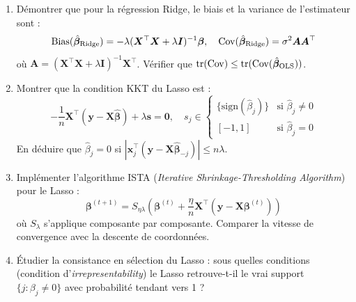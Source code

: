 \begin{exercice}
\begin{enumerate}
  \item D\'emontrer que pour la r\'egression Ridge, le biais et la variance de
        l'estimateur sont :
        \[
          \mathrm{Bias}(\hat{\bm{\beta}}_{\text{Ridge}}) = -\lambda(\bm{X}^\top\bm{X} + \lambda\bm{I})^{-1}\bm{\beta},
          \quad
          \mathrm{Cov}(\hat{\bm{\beta}}_{\text{Ridge}}) = \sigma^2 \bm{A}\bm{A}^\top
        \]
        o\`u $\bm{A} = (\bm{X}^\top\bm{X} + \lambda\bm{I})^{-1}\bm{X}^\top$.
        V\'erifier que $\text{tr}(\mathrm{Cov}) \leq \text{tr}(\mathrm{Cov}(\hat{\bm{\beta}}_{\text{OLS}}))$.
  \item Montrer que la condition KKT du Lasso est :
        \[
          -\frac{1}{n}\bm{X}^\top(\bm{y} - \bm{X}\hat{\bm{\beta}})
          + \lambda \bm{s} = \bm{0}, \quad
          s_j \in \begin{cases} \{\text{sign}(\hat{\beta}_j)\} & \text{si } \hat{\beta}_j \neq 0 \\
          [-1, 1] & \text{si } \hat{\beta}_j = 0 \end{cases}
        \]
        En d\'eduire que $\hat{\beta}_j = 0$ si $|\bm{x}_j^\top(\bm{y} - \bm{X}\hat{\bm{\beta}}_{-j})| \leq n\lambda$.
  \item Impl\'ementer l'algorithme ISTA (\emph{Iterative Shrinkage-Thresholding Algorithm})
        pour le Lasso :
        \[
          \bm{\beta}^{(t+1)} = S_{\eta\lambda}\!\left(\bm{\beta}^{(t)}
          + \frac{\eta}{n}\bm{X}^\top(\bm{y} - \bm{X}\bm{\beta}^{(t)})\right)
        \]
        o\`u $S_\lambda$ s'applique composante par composante.
        Comparer la vitesse de convergence avec la descente de coordonn\'ees.
  \item \'Etudier la consistance en s\'election du Lasso : sous quelles conditions
        (condition d'\emph{irrepresentability}) le Lasso retrouve-t-il le vrai support
        $\{j : \beta_j \neq 0\}$ avec probabilit\'e tendant vers 1 ?
\end{enumerate}
\end{exercice}
